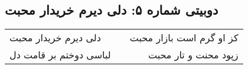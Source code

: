 \begin{center}
\section*{دوبیتی شماره ۵: دلی دیرم خریدار محبت}
\label{sec:005}
\begin{longtable}{l p{0.5cm} r}
دلی دیرم خریدار محبت
&&
کز او گرم است بازار محبت
\\
لباسی دوختم بر قامت دل
&&
زپود محنت و تار محبت
\\
\end{longtable}
\end{center}
